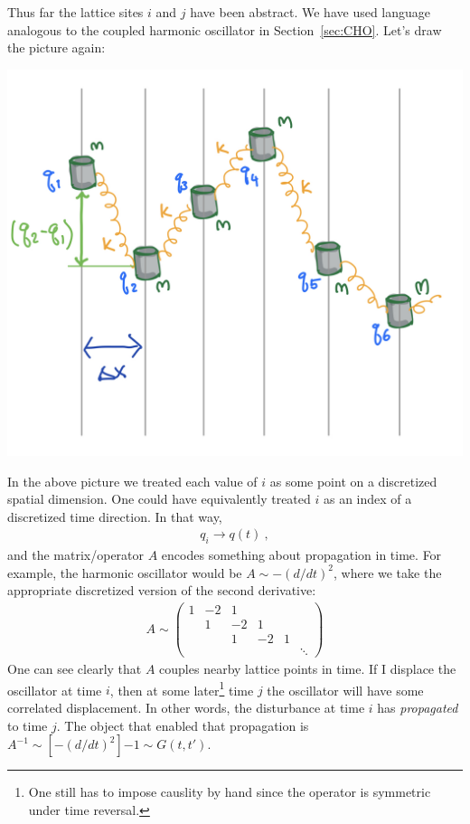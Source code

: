 Thus far the lattice sites $i$ and $j$ have been abstract. We have used language analogous to the coupled harmonic oscillator in Section~\ref{sec:CHO}. Let's draw the picture again: 
\begin{center}
\includegraphics[width=.5\textwidth]{figures/coupledHO.jpg}
\end{center}
In the above picture we treated each value of $i$ as some point on a discretized spatial dimension. One could have equivalently treated $i$ as an index of a discretized time direction. In that way,
\begin{align}
	q_i \to q(t) \ ,
\end{align}
and the matrix/operator $A$ encodes something about propagation in time. For example, the harmonic oscillator would be $A \sim -(d/dt)^2$, where we take the appropriate discretized version of the second derivative:
\begin{align}
	A \sim 
	\begin{pmatrix}
	1 	& -2 & 1  &    &   &\\
		& 1  & -2 & 1  &   &\\
		&	 & 1  & -2 & 1 &\\
		&	&	&	&	& \ddots
	\end{pmatrix}
\end{align}
One can see clearly that $A$ couples nearby lattice points in time. If I displace the oscillator at time $i$, then at some later\footnote{One still has to impose causlity by hand since the operator is symmetric under time reversal.} time $j$ the oscillator will have some correlated displacement. In other words, the disturbance at time $i$ has \emph{propagated} to time $j$. The object that enabled that propagation is $A^{-1} \sim [-(d/dt)^2]{-1} \sim G(t,t')$. 

